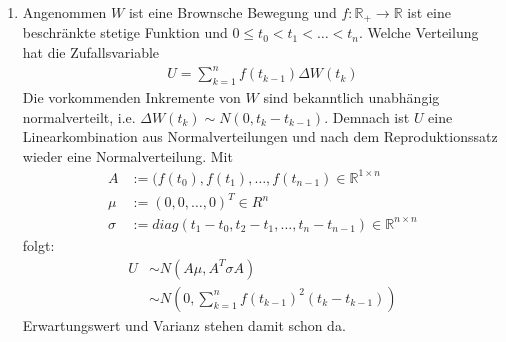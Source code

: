 \documentclass[a4paper,11pt,notitlepage,fullpage]{article}
\newcommand{\R}{\mathbb R}
\begin{document}
\begin{enumerate}
\begin{enumerate}
\end{enumerate}


\item Angenommen $W$ ist eine Brownsche Bewegung und $f: \R_+ \to \R$ ist eine beschränkte stetige Funktion und $0 \leq t_0 < t_1 < \ldots < t_n$. Welche Verteilung hat die Zufallsvariable
\begin{align*}
U = \sum_{k=1}^n f(t_{k-1})\Delta W(t_k)
\end{align*}
Die vorkommenden Inkremente von $W$ sind bekanntlich unabhängig normalverteilt, i.e. $\Delta W(t_k) \sim N(0, t_k - t_{k-1})$. Demnach ist $U$ eine Linearkombination aus Normalverteilungen und nach dem Reproduktionssatz wieder eine Normalverteilung. Mit
\begin{align*}
A &:= (f(t_0), f(t_1), \ldots, f(t_{n-1}) \in \R^{1\times n} \\
\mu &:= (0, 0, \ldots, 0)^T \in R^n \\
\sigma &:= diag(t_1 - t_0, t_2 - t_1, \ldots, t_n - t_{n-1}) \in \R^{n\times n}
\end{align*}
folgt:
\begin{align*}
U &\sim N\left(A\mu, A^T \sigma A\right) \\
&\sim N\left(0, \sum_{k=1}^n f(t_{k-1})^2(t_k - t_{k-1})\right)
\end{align*}
Erwartungswert und Varianz stehen damit schon da.


\end{enumerate}
\end{document}
